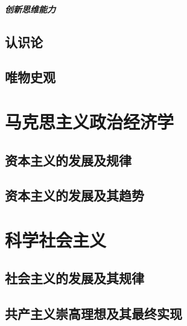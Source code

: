 \documentclass[11pt, UTF8]{book} %
\renewcommand{\chaptermark}[1]{\markboth{第 \thechapter 章 \hspace{1em} #1}{}}
\begin{document}
\subsubsection{创新思维能力}

\newpage
\thispagestyle{empty}

\chapter{认识论}
\chapter{唯物史观}

\part{马克思主义政治经济学}

\chapter{资本主义的发展及规律}
\chapter{资本主义的发展及其趋势}

\part{科学社会主义}

\chapter{社会主义的发展及其规律}
\chapter{共产主义崇高理想及其最终实现}

\appendix
\renewcommand{\chaptermark}[1]{\markboth{附录 \thechapter\, #1}{}}

\end{document}
